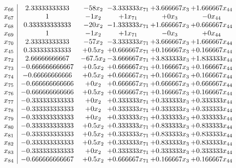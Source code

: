 \documentclass[11pt]{article}
\begin{document}
\[\begin{array}{c| c c@{\hskip 2pt} c@{\hskip 2pt} c@{\hskip 2pt} c@{\hskip 2pt} }
 x_{66}   &  2.33333333333 & -58 x_{2} & -3.333333 x_{71} & + 3.666667 x_{3} & + 1.666667 x_{44}\\
 x_{67}   &  1 & -1 x_{2} & + 1 x_{71} & + 0 x_{3} & -0 x_{44}\\
 x_{68}   &  0.333333333333 & -20 x_{2} & -1.333333 x_{71} & + 1.666667 x_{3} & + 0.666667 x_{44}\\
 x_{69}   &  1 & -1 x_{2} & + 1 x_{71} & -0 x_{3} & + 0 x_{44}\\
 x_{70}   &  2.33333333333 & -57 x_{2} & -3.333333 x_{71} & + 3.666667 x_{3} & + 1.666667 x_{44}\\
 x_{45}   &  0.333333333333 & + 0.5 x_{2} & + 0.666667 x_{71} & + 0.166667 x_{3} & + 0.166667 x_{44}\\
 x_{72}   &  2.66666666667 & -67.5 x_{2} & -3.666667 x_{71} & + 3.833333 x_{3} & + 1.833333 x_{44}\\
 x_{73}   &  -0.666666666667 & + 0.5 x_{2} & + 0.666667 x_{71} & + 0.166667 x_{3} & + 0.166667 x_{44}\\
 x_{74}   &  -0.66666666666 & + 0.5 x_{2} & + 0.666667 x_{71} & + 0.166667 x_{3} & + 0.166667 x_{44}\\
 x_{75}   &  -0.666666666666 & + 0 x_{2} & + 0.666667 x_{71} & + 0.666667 x_{3} & + 0.666667 x_{44}\\
 x_{76}   &  -0.666666666666 & + 0.5 x_{2} & + 0.666667 x_{71} & + 0.166667 x_{3} & + 0.166667 x_{44}\\
 x_{77}   &  -0.333333333333 & + 0 x_{2} & + 0.333333 x_{71} & + 0.333333 x_{3} & + 0.333333 x_{44}\\
 x_{78}   &  -0.333333333333 & + 0 x_{2} & + 0.333333 x_{71} & + 0.333333 x_{3} & + 0.333333 x_{44}\\
 x_{79}   &  -0.333333333333 & + 0 x_{2} & + 0.333333 x_{71} & + 0.333333 x_{3} & + 0.333333 x_{44}\\
 x_{80}   &  -0.333333333333 & + 0.5 x_{2} & + 0.333333 x_{71} & + 0.833333 x_{3} & + 0.833333 x_{44}\\
 x_{81}   &  -0.333333333333 & + 0.5 x_{2} & + 0.333333 x_{71} & + 0.833333 x_{3} & + 0.833333 x_{44}\\
 x_{82}   &  -0.333333333333 & + 0.5 x_{2} & + 0.333333 x_{71} & + 0.833333 x_{3} & + 0.833333 x_{44}\\
 x_{83}   &  -0.333333333333 & + 0 x_{2} & + 0.333333 x_{71} & + 0.333333 x_{3} & + 0.333333 x_{44}\\
 x_{84}   &  -0.666666666667 & + 0.5 x_{2} & + 0.666667 x_{71} & + 0.166667 x_{3} & + 0.166667 x_{44}\\

\end{array}\]
\end{document}
